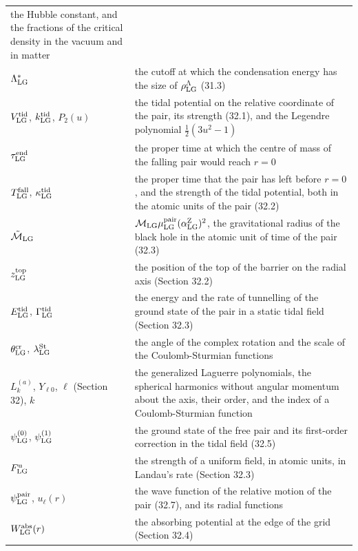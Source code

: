 \documentclass[
  10pt,
]{article}
\begin{document}
\begin{longtable}[]{@{}
  >{\raggedright\arraybackslash}p{}
  >{\raggedright\arraybackslash}p{}@{}}
the Hubble constant, and the fractions of the critical density in the
vacuum and in matter \\
\(\Lambda^*_{\rm LG}\) & the cutoff at which the condensation energy has
the size of \(\rho^\Lambda_{\rm LG}\) (31.3) \\
\(V^{\rm tid}_{\rm LG}\), \(k^{\rm tid}_{\rm LG}\), \(P_2(u)\) & the
tidal potential on the relative coordinate of the pair, its strength
(32.1), and the Legendre polynomial \(\tfrac12(3u^2-1)\) \\
\(\tau^{\rm end}_{\rm LG}\) & the proper time at which the centre of
mass of the falling pair would reach \(r=0\) \\
\(T^{\rm fall}_{\rm LG}\), \(\kappa^{\rm tid}_{\rm LG}\) & the proper
time that the pair has left before \(r=0\), and the strength of the
tidal potential, both in the atomic units of the pair (32.2) \\
\(\tilde{\mathcal M}_{\rm LG}\) &
\(\mathcal M_{\rm LG}\mu^{\rm pair}_{\rm LG}(\alpha^{\rm Z}_{\rm LG})^2\),
the gravitational radius of the black hole in the atomic unit of time of
the pair (32.3) \\
\(z^{\rm top}_{\rm LG}\) & the position of the top of the barrier on the
radial axis (Section 32.2) \\
\(E^{\rm tid}_{\rm LG}\), \(\Gamma^{\rm tid}_{\rm LG}\) & the energy and
the rate of tunnelling of the ground state of the pair in a static tidal
field (Section 32.3) \\
\(\theta^{\rm cr}_{\rm LG}\), \(\lambda^{\rm St}_{\rm LG}\) & the angle
of the complex rotation and the scale of the Coulomb-Sturmian
functions \\
\(L^{(a)}_k\), \(Y_{\ell0}\), \(\ell\) (Section 32), \(k\) & the
generalized Laguerre polynomials, the spherical harmonics without
angular momentum about the axis, their order, and the index of a
Coulomb-Sturmian function \\
\(\psi^{(0)}_{\rm LG}\), \(\psi^{(1)}_{\rm LG}\) & the ground state of
the free pair and its first-order correction in the tidal field
(32.5) \\
\(F^{\rm u}_{\rm LG}\) & the strength of a uniform field, in atomic
units, in Landau's rate (Section 32.3) \\
\(\psi^{\rm pair}_{\rm LG}\), \(u_\ell(r)\) & the wave function of the
relative motion of the pair (32.7), and its radial functions \\
\(W^{\rm abs}_{\rm LG}(r)\) & the absorbing potential at the edge of the
grid (Section 32.4) \\

\end{longtable}
\end{document}

